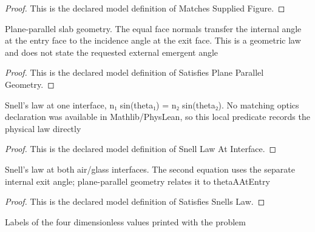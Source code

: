 \begin{proof}
  This is the declared model definition of Matches Supplied Figure.
\end{proof}
\begin{definition}
  \label{def:physics:phyx-mini-0138:phyxminiproblems-problemphyxmini0138-satisfiesplaneparallelgeometry}
  Plane-parallel slab geometry. The equal face normals transfer the internal angle at the entry face to the incidence angle at the exit face. This is a geometric law and does not state the requested external emergent angle
\end{definition}
\begin{proof}
  This is the declared model definition of Satisfies Plane Parallel Geometry.
\end{proof}
\begin{definition}
  \label{def:physics:phyx-mini-0138:phyxminiproblems-problemphyxmini0138-snelllawatinterface}
  Snell's law at one interface, n₁ sin(theta₁) = n₂ sin(theta₂). No matching optics declaration was available in Mathlib/PhysLean, so this local predicate records the physical law directly
\end{definition}
\begin{proof}
  This is the declared model definition of Snell Law At Interface.
\end{proof}
\begin{definition}
  \label{def:physics:phyx-mini-0138:phyxminiproblems-problemphyxmini0138-satisfiessnellslaw}
  Snell's law at both air/glass interfaces. The second equation uses the separate internal exit angle; plane-parallel geometry relates it to thetaAAtEntry
\end{definition}
\begin{proof}
  This is the declared model definition of Satisfies Snells Law.
\end{proof}
\begin{definition}
  \label{def:physics:phyx-mini-0138:phyxminiproblems-problemphyxmini0138-answerchoice}
  Labels of the four dimensionless values printed with the problem
\end{definition}
